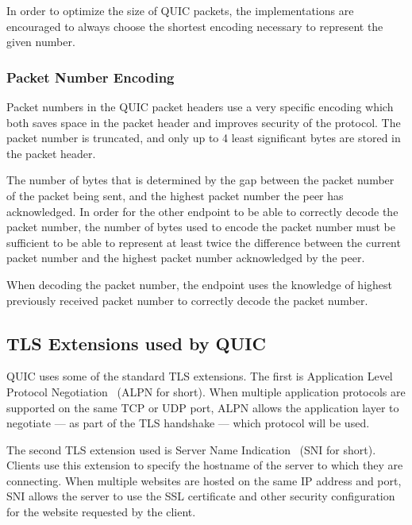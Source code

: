 In order to optimize the size of QUIC packets, the implementations are encouraged to always choose
the shortest encoding necessary to represent the given number.

\subsubsection{Packet Number Encoding}\label{sec:packet-number-encoding}


Packet numbers in the QUIC packet headers use a very specific encoding which both saves space in the
packet header and improves security of the protocol. The packet number is truncated, and only up to
4 least significant bytes are stored in the packet header.

The number of bytes that is determined by the gap between the packet number of the packet being
sent, and the highest packet number the peer has acknowledged. In order for the other endpoint to be
able to correctly decode the packet number, the number of bytes used to encode the packet number
must be sufficient to be able to represent at least twice the difference between the current packet
number and the highest packet number acknowledged by the peer.

When decoding the packet number, the endpoint uses the knowledge of highest previously received
packet number to correctly decode the packet number.



\subsection{TLS Extensions used by QUIC}


QUIC uses some of the standard TLS extensions. The first is Application Level Protocol
Negotiation~\cite{rfc7301} (ALPN for short). When multiple application protocols are supported on
the same TCP or UDP port, ALPN allows the application layer to negotiate --- as part of the TLS
handshake --- which protocol will be used.

The second TLS extension used is Server Name Indication~\cite{rfc6066} (SNI for short). Clients use
this extension to specify the hostname of the server to which they are connecting. When multiple
websites are hosted on the same IP address and port, SNI allows the server to use the SSL
certificate and other security configuration for the website requested by the client.


